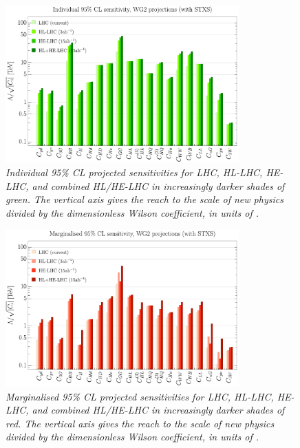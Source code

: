 \documentclass[../report.tex]{subfiles}
\begin{document}
\begin{figure}
  \centering
 \includegraphics[width=0.8\textwidth]{section8/plots/individualbarchart.pdf}
 \vspace{-0.2cm}
 \caption{\it Individual 95\% CL projected sensitivities for LHC, HL-LHC, HE-LHC, and combined HL/HE-LHC in increasingly darker shades of green. The vertical axis gives the reach to the scale of new physics divided by the dimensionless Wilson coefficient, in units of \UTeV. }
   \label{fig:indiv}
\end{figure} 

\begin{figure}
  \centering
 \includegraphics[width=0.8\textwidth]{section8/plots/marginalisedbarchart.pdf}
 \vspace{-0.2cm}
 \caption{\it  Marginalised 95\% CL projected sensitivities for LHC, HL-LHC, HE-LHC, and combined HL/HE-LHC in increasingly darker shades of red. The vertical axis gives the reach to the scale of new physics divided by the dimensionless Wilson coefficient, in units of \UTeV.}
   \label{fig:marg}
\end{figure} 
\end{document}
